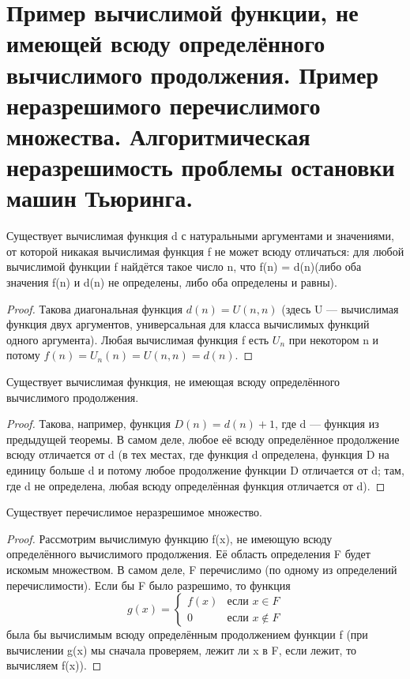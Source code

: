\section{Пример вычислимой функции, не имеющей всюду определённого вычислимого продолжения. Пример неразрешимого перечислимого множества. Алгоритмическая неразрешимость проблемы остановки машин Тьюринга.}
\begin{theorem}
Существует вычислимая функция d с натуральными аргументами и значениями, от которой никакая вычислимая функция f не может всюду отличаться: для любой вычислимой функции f найдётся такое число n, что f(n) = d(n)(либо оба значения f(n) и d(n) не определены, либо оба определены и равны).
\end{theorem}
\begin{proof}
Такова диагональная функция $d(n) = U(n,n)$ (здесь U — вычислимая функция двух аргументов, универсальная для класса вычислимых функций одного аргумента). Любая вычислимая функция f есть $U_n$ при некотором n и потому $f(n) = U_n(n) = U(n,n) = d(n)$.
\end{proof}
\begin{theorem}
Существует вычислимая функция, не имеющая всюду определённого вычислимого продолжения.
\end{theorem}
\begin{proof}
Такова, например, функция $D(n) = d(n) + 1$, где d — функция из предыдущей теоремы. В самом деле, любое её всюду определённое продолжение всюду отличается от d (в тех местах, где функция d определена, функция D на единицу больше d и потому любое продолжение функции D отличается от d; там, где d не определена, любая всюду определённая функция отличается от d).
\end{proof}
\begin{theorem}
Существует перечислимое неразрешимое множество.
\end{theorem}
\begin{proof}
Рассмотрим вычислимую функцию f(x), не имеющую всюду определённого вычислимого продолжения. Её область определения F будет искомым множеством. В самом деле, F перечислимо (по одному из определений перечислимости). Если бы F было разрешимо, то функция
\begin{equation*}
g(x) = 
 \begin{cases}
   f(x) &\text{если $x \in F$}\\
   0 &\text{если $x \notin F$}
 \end{cases}
\end{equation*} 
была бы вычислимым всюду определённым продолжением функции f (при вычислении g(x) мы сначала проверяем, лежит ли x в F, если лежит, то вычисляем f(x)).
\end{proof}

